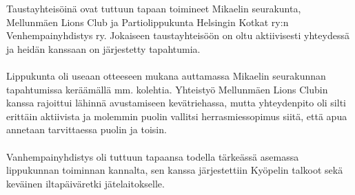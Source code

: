 \documentclass[a4paper, 12pt, finnish]{report} %
\begin{document}
Taustayhteisöinä ovat tuttuun tapaan toimineet Mikaelin seurakunta, Mellunmäen Lions Club ja Partiolippukunta Helsingin Kotkat ry:n Venhempainyhdistys ry. Jokaiseen taustayhteisöön on oltu aktiivisesti yhteydessä ja heidän kanssaan on järjestetty tapahtumia.\\
\\Lippukunta oli useaan otteeseen mukana auttamassa Mikaelin seurakunnan tapahtumissa keräämällä mm. kolehtia. Yhteistyö Mellunmäen Lions Clubin kanssa rajoittui lähinnä avustamiseen kevätriehassa, mutta yhteydenpito oli silti erittäin aktiivista ja molemmin puolin vallitsi herrasmiessopimus siitä, että apua annetaan tarvittaessa puolin ja toisin.\\
\\Vanhempainyhdistys oli tuttuun tapaansa todella tärkeässä asemassa lippukunnan toiminnan kannalta, sen kanssa järjestettiin Kyöpelin talkoot sekä keväinen iltapäiväretki jätelaitokselle. 
\end{document}
